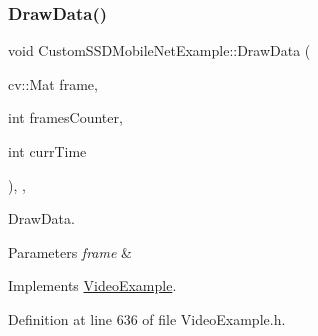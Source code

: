 \subsubsection{\texorpdfstring{Draw\+Data()}{DrawData()}}
{\footnotesize\ttfamily void Custom\+S\+S\+D\+Mobile\+Net\+Example\+::\+Draw\+Data (\begin{DoxyParamCaption}\item[{cv\+::\+Mat}]{frame,  }\item[{int}]{frames\+Counter,  }\item[{int}]{curr\+Time }\end{DoxyParamCaption})\hspace{0.3cm}{\ttfamily [inline]}, {\ttfamily [protected]}, {\ttfamily [virtual]}}



Draw\+Data. 


\begin{DoxyParams}{Parameters}
{\em frame} & \\
\hline
\end{DoxyParams}


Implements \mbox{\hyperlink{class_video_example_a53eb15977cb147dac218d8ea337986cd}{Video\+Example}}.



Definition at line 636 of file Video\+Example.\+h.


